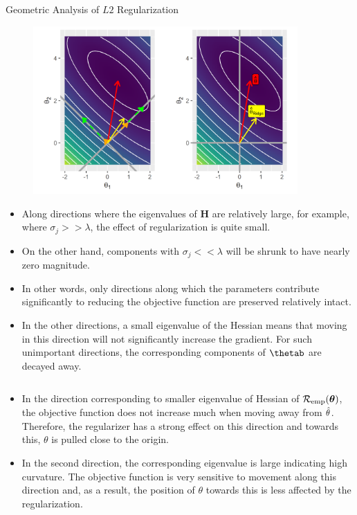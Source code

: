 \documentclass[11pt,compress,t,notes=noshow, xcolor=table]{beamer}
\begin{document}
\begin{vbframe}{Geometric Analysis of $L2$ Regularization}
\begin{figure}
\includegraphics[width=0.9\textwidth]{figure/l2_reg_hess_03_plot.png}\\
\end{figure}


\framebreak

  
\begin{itemize} 
  \item Along directions where the eigenvalues of $\bm{H}$ are relatively large, for example, where $\sigma_j >> \lambda$, the effect of regularization is quite small.
  \item On the other hand, components with $\sigma_j << \lambda$ will be shrunk to have nearly zero magnitude.
  \item In other words, only directions along which the parameters contribute significantly to reducing the objective function are preserved relatively intact.
  \item In the other directions, a small eigenvalue of the Hessian means that moving in this direction will not significantly increase the gradient. For such unimportant directions, the corresponding components of $\thetab$ are decayed away.
  \end{itemize}
  
  \framebreak
  
  \begin{columns}
    \begin{column}{0.5\textwidth}
      
      {\scriptsize
      \begin{itemize}\setlength{\itemsep}{1.0em}
          \item
          In the direction corresponding to smaller eigenvalue of Hessian of $\mathcal{R}_{\text{emp}}(\bm{\theta})$, the objective function does not increase much when moving away from $\hat{\theta}$. Therefore, the regularizer has a strong effect on this direction and towards this, $\theta$ is pulled close to the origin.    
          \item In the second direction, the corresponding eigenvalue is large indicating high curvature. The objective function is very sensitive to movement along this direction and, as a result, the position of $\theta$ towards this is less affected by the regularization.
        \end{itemize}
      }
      \end{column}
    

\end{columns}
\end{vbframe}
\end{document}
